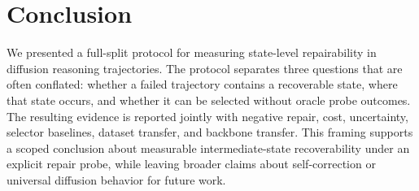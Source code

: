 \section{Conclusion}

We presented a full-split protocol for measuring state-level repairability in diffusion reasoning trajectories. The protocol separates three questions that are often conflated: whether a failed trajectory contains a recoverable state, where that state occurs, and whether it can be selected without oracle probe outcomes. The resulting evidence is reported jointly with negative repair, cost, uncertainty, selector baselines, dataset transfer, and backbone transfer. This framing supports a scoped conclusion about measurable intermediate-state recoverability under an explicit repair probe, while leaving broader claims about self-correction or universal diffusion behavior for future work.
